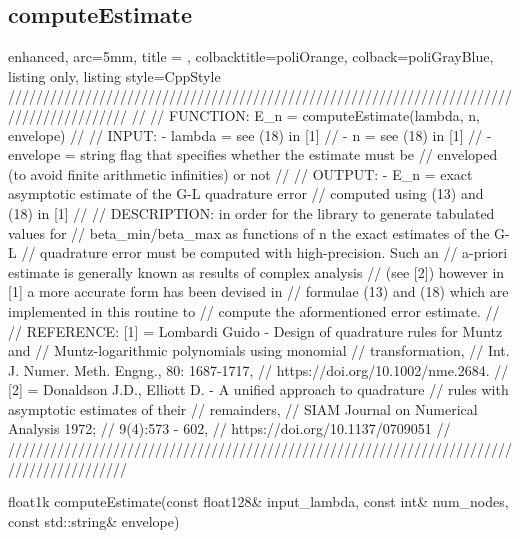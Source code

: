 \documentclass[a4paper, twosided]{book}
\begin{document}
\subsection[computeEstimate]{\changefont computeEstimate}\label{SubSec4.1.1}

\begin{tcblisting}{enhanced,
                   arc=5mm,
                   title = \color{black}{\large \ttfamily MonMap.cpp/computeEstimate},
                   colbacktitle=poliOrange,
                   colback=poliGrayBlue,
                   listing only,
                   listing style=CppStyle}
/////////////////////////////////////////////////////////////////////////////////////////
//
//       FUNCTION: E_n = computeEstimate(lambda, n, envelope)
//                
//          INPUT: - lambda = see (18) in [1]
//                 - n = see (18) in [1]
//                 - envelope = string flag that specifies whether the estimate must be 
//                              enveloped (to avoid finite arithmetic infinities) or not
//
//         OUTPUT: - E_n = exact asymptotic estimate of the G-L quadrature error 
//                   computed using (13) and (18) in [1]
//
//    DESCRIPTION: in order for the library to generate tabulated values for 
//                 beta_min/beta_max as functions of n the exact estimates of the G-L 
//                 quadrature error must be computed with high-precision. Such an 
//                 a-priori estimate is generally known as results of complex analysis
//                 (see [2]) however in [1] a more accurate form has been devised in
//                 formulae (13) and (18) which are implemented in this routine to 
//                 compute the aformentioned error estimate.
//
//      REFERENCE: [1] = Lombardi Guido - Design of quadrature rules for Muntz and 
//                                        Muntz-logarithmic polynomials using monomial
//                                        transformation,
//                                        Int. J. Numer. Meth. Engng., 80: 1687-1717,
//                                        https://doi.org/10.1002/nme.2684.
//                 [2] = Donaldson J.D., Elliott D. - A unified approach to quadrature
//                                        rules with asymptotic estimates of their
//                                        remainders,
//                                        SIAM Journal on Numerical Analysis 1972;
//                                        9(4):573 - 602,
//                                        https://doi.org/10.1137/0709051
//
/////////////////////////////////////////////////////////////////////////////////////////

float1k computeEstimate(const float128& input_lambda, const int& num_nodes, const std::string& envelope)
\end{tcblisting}
\end{document}
